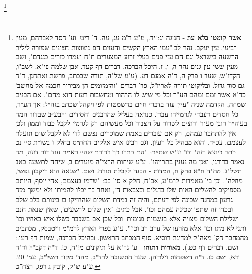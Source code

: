 \begin{multicols}{2}
\footnote{ \textbf{אשר קומטו בלא עת} - חגיגה יג:־יד., ע"ע ר"מ עג, עה. ה' ריט. וע' חסד לאברהם, מעין רביעי, עין יעקב, נהר לב "עמי הארץ הקשים והעזים הם ניצוצות חצונים שפזרה לילית הרשעה בישראל וגם הם עזי פנים בעלי זרוע המצערים ת"ח ועמדו כזרים כנגדם", ושם מעין ששי עין גנים נהר ה, ו, ז. היכל הברכה, דברים דף קעד. אבן שלמה פי"א. לשב"ו, הקדו"ש, שער ו פרק ה, ד"ה אמנם דע. \newline
(ע"ע של"ה, תורה שבכתב, פרשת ואתחנן, ד"ה גם סוד גדול. ובליקוטי תורה לאריז"ל, פר' דברים "והזמזומים הן מבירור חכמה אל מחשב' כד"א אשר זמם ומהם הע"ר וכל מי שיש לו הרהור ומחשבות רעות הוא מהם". אם הבנים שמחה, הקדמה שניה "עיין עוד בדברי חיים בהשמטות לפ׳ ויקהל שכתב בזה״ל: אך הע״ר, כל חסדים דעבדי לגרמייהו עבדי. כנראה בעליל שהרבנים וחסידים והבע״ב שבדור המה בעוה״ר רובן מע״ר ורוצים לשרור על הצבור וכל מעשיהם רק לגרמי׳ לקבל כבוד וממון ולכן אין להתחבר עמהם, רק אם עובדים באמת שמוסרים נפשם לד׳ לא לקבל שום תועלת לעצמם, עכ״ד. והוא מבהיל כל רעיון. וגם רבינו איש אלקים החת״ס בחלק ו בשו״ת סי׳ נט כתב כיוצא בזה" וכו' ע"ש שסיים: "הם כתבו כך בדורם שהי׳ באמת עוד דור דעה, מה נאמר בדורנו, ואנן מה נענין בתרייהו". ע"ע שיחות הרצי"ה מועדים ב, שיחה לתשעה באב תשל"ג. מה"ה ח"א פרק ח, המדות - הכנה לקבלת תורה. ושם: "שנאה היא ריקבון נפשי, מחלה". וכן בי' מאמרות לרמ"ע, אכ"ח, חלק א סי' כב: "שדמו בעצמם, אחי יוסף, היותם מספיקים להשלים האות שלו בדגלים ובצבאות ה', ואחר כך יכלו להמיתו ולא ימשך מזה גרעון במחנה שכינה לפי דעתם, והיה זה במדת השלום שהחזיקו בו בינותם בלב שלם ובכחו זה שתפו שכינה עמהם וכו'. אבל כתיב: 'אין שלום לרשעים', שאין שנאת חנם ושלילת השלום מצויה אלא בנשמות פגומות, וכל שכן אם בשכבר כשלו איש באחיו וכו' ותני לא מתו וכו' אלא מזרעו של ערב רב וכו'". ע"ע בפרי הארץ לרמ"מ וויטבסק, מכתבים מהמחבר הק' מאה"ק למדינת רוסיא, סוף המכתב הראשון. ובהיכל הברכה, שמות דף רעו.: ושם, דברים דף כט.).\newline
\textbf{מאורות }\textbf{דתוהו}\textbf{ }- ע' גר"א על תיקונים מז"ח, כז. ד"ה דקב"ה וד"ה ודא, ושם כז: ד"ה השפחות וילדיהן. שער התשובה לרד"ב, מהד' מקור תשל"ב, עמ' 20. ע"ע ש"ק, קובץ ג רפג, רצח־ט.\label{3}}\צהגדרה{[ע"ר א פ־פא, מ"ר }\צהגדרה{]. }\\\\


\end{multicols}
